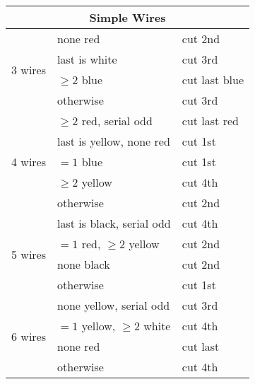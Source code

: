 \documentclass[11pt]{amsart}
\begin{document}
\begin{tabular}{|l|l|l|}
\hline
\multicolumn{3}{|c|}{Simple Wires} \\
\hline
\multirow{4}{*}{3 wires} & none red                    & cut 2nd \\
                         & last is white               & cut 3rd \\
                         & $\ge 2$ blue                & cut last blue \\
                         & otherwise                   & cut 3rd \\
\hline
\multirow{5}{*}{4 wires} & $\ge 2$ red, serial odd     & cut last red \\
                         & last is yellow, none red    & cut 1st \\
                         & $= 1$ blue                  & cut 1st \\
                         & $\ge 2$ yellow              & cut 4th \\
                         & otherwise                   & cut 2nd \\
\hline
\multirow{4}{*}{5 wires} & last is black, serial odd   & cut 4th \\
                         & $= 1$ red, $\ge 2$ yellow   & cut 2nd \\
                         & none black                  & cut 2nd \\
                         & otherwise                   & cut 1st \\
\hline
\multirow{4}{*}{6 wires} & none yellow, serial odd     & cut 3rd \\
                         & $= 1$ yellow, $\ge 2$ white & cut 4th \\
                         & none red                    & cut last \\
                         & otherwise                   & cut 4th \\
\hline
\end{tabular}
\end{document}
